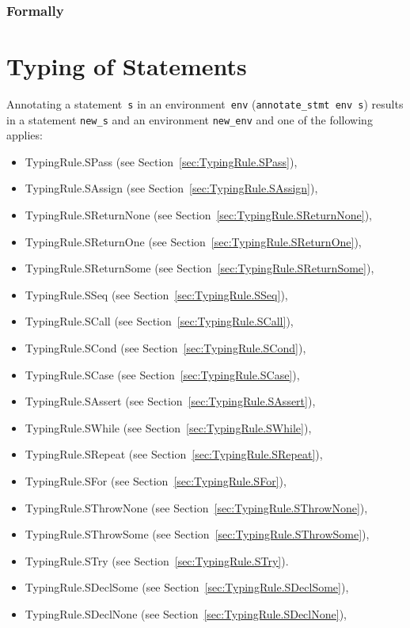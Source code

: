 \documentclass{book}
\begin{document}
\begin{emptyformal}
    \subsection{Formally}
\end{emptyformal}


\chapter{Typing of Statements}

Annotating a statement~\texttt{s} in an environment~\texttt{env}
(\texttt{annotate\_stmt env s}) results in a statement \texttt{new\_s} and an
environment \texttt{new\_env} and one of the following applies:
\begin{itemize}
\item TypingRule.SPass (see Section~\ref{sec:TypingRule.SPass}),
\item TypingRule.SAssign (see Section~\ref{sec:TypingRule.SAssign}),
\item TypingRule.SReturnNone (see Section~\ref{sec:TypingRule.SReturnNone}),
\item TypingRule.SReturnOne (see Section~\ref{sec:TypingRule.SReturnOne}),
\item TypingRule.SReturnSome (see Section~\ref{sec:TypingRule.SReturnSome}),
\item TypingRule.SSeq (see Section~\ref{sec:TypingRule.SSeq}),
\item TypingRule.SCall (see Section~\ref{sec:TypingRule.SCall}),
\item TypingRule.SCond (see Section~\ref{sec:TypingRule.SCond}),
\item TypingRule.SCase (see Section~\ref{sec:TypingRule.SCase}),
\item TypingRule.SAssert (see Section~\ref{sec:TypingRule.SAssert}),
\item TypingRule.SWhile (see Section~\ref{sec:TypingRule.SWhile}),
\item TypingRule.SRepeat (see Section~\ref{sec:TypingRule.SRepeat}),
\item TypingRule.SFor (see Section~\ref{sec:TypingRule.SFor}),
\item TypingRule.SThrowNone (see Section~\ref{sec:TypingRule.SThrowNone}),
\item TypingRule.SThrowSome (see Section~\ref{sec:TypingRule.SThrowSome}),
\item TypingRule.STry (see Section~\ref{sec:TypingRule.STry}).
\item TypingRule.SDeclSome (see Section~\ref{sec:TypingRule.SDeclSome}),
\item TypingRule.SDeclNone (see Section~\ref{sec:TypingRule.SDeclNone}),
\end{itemize}
\end{document}
